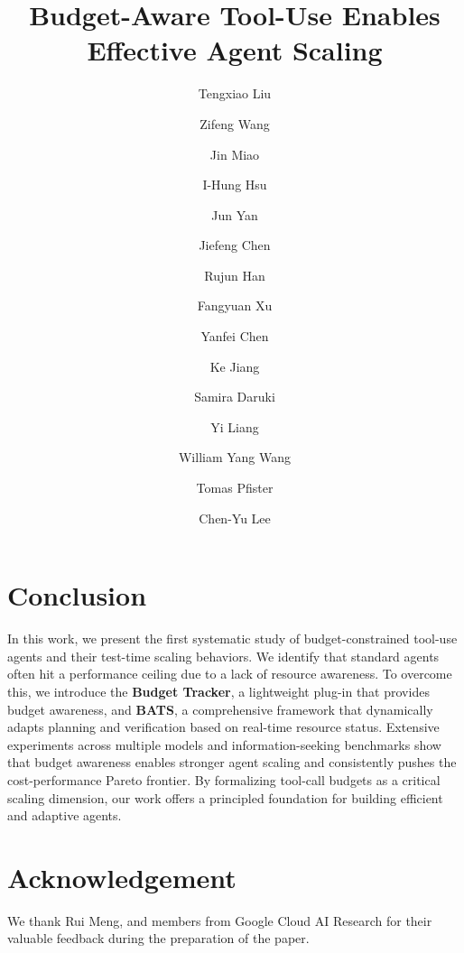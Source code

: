 \documentclass[11pt, a4paper, confidential, copyright, goog]{google}
\title{Budget-Aware Tool-Use Enables Effective Agent Scaling}
\author[1*]{Tengxiao Liu}
\author[2]{Zifeng Wang}
\author[3]{Jin Miao}
\author[2]{I-Hung Hsu}
\author[2]{Jun Yan}
\author[2]{Jiefeng Chen}
\author[2]{Rujun Han}
\author[4]{Fangyuan Xu}
\author[2]{Yanfei Chen}
\author[2]{Ke Jiang}
\author[2]{Samira Daruki}
\author[3]{Yi Liang}
\author[1]{William Yang Wang}
\author[2]{Tomas Pfister}
\author[2]{Chen-Yu Lee}
\affil[1]{UC Santa Barbara}
\affil[2]{Google Cloud AI Research}
\affil[3]{Google DeepMind}
\affil[4]{New York University}
\newcommand{\method}{BATS\xspace}
\begin{document}
\maketitle















\section{Conclusion}
In this work, we present the first systematic study of budget-constrained tool-use agents and their test-time scaling behaviors.
We identify that standard agents often hit a performance ceiling due to a lack of resource awareness. To overcome this, we introduce the \textbf{Budget Tracker}, a lightweight plug-in that provides budget awareness, and \textbf{\method}, a comprehensive framework that dynamically adapts planning and verification based on real-time resource status. Extensive experiments across multiple models and information-seeking benchmarks show that budget awareness enables stronger agent scaling and consistently pushes the cost-performance Pareto frontier. By formalizing tool-call budgets as a critical scaling dimension, our work offers a principled foundation for building efficient and adaptive agents.

\section*{Acknowledgement}

We thank Rui Meng, and members from Google Cloud AI Research for their valuable
feedback during the preparation of the paper.




\end{document}
